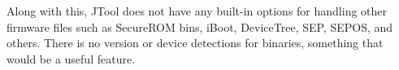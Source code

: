 Along with this, JTool does not have any built-in options for handling other firmware files such as SecureROM bins, iBoot, DeviceTree, SEP, SEPOS, and others. There is no version or device detections for binaries, something that would be a useful feature.

















